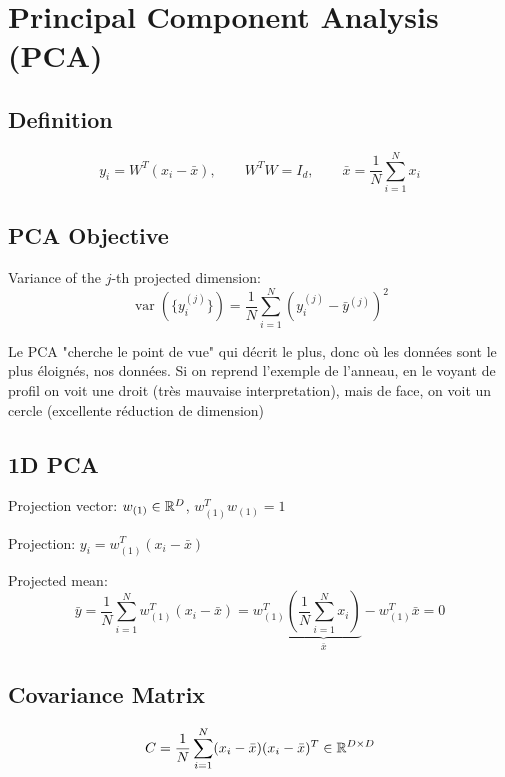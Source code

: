 \documentclass[11pt,a4paper,openany]{book}
\begin{document}
\section{Principal Component Analysis (PCA)}

\subsection{Definition}

\begin{defnbox}[title=PCA Projection]
\[
y_i = W^T(x_i - \bar{x}),
\qquad W^T W = I_d,
\qquad \bar{x} = \frac{1}{N}\sum_{i=1}^{N} x_i
\]
\end{defnbox}

\subsection{PCA Objective}

Variance of the \(j\)-th projected dimension:
\[
\operatorname{var}(\{y_i^{(j)}\})
=
\frac{1}{N}\sum_{i=1}^{N}\left(y_i^{(j)} - \bar{y}^{(j)}\right)^2
\]

\begin{propbox}[title=PCA Objective]
Le PCA "cherche le point de vue" qui décrit le plus, donc où les données sont le plus éloignés, nos données. Si on reprend l'exemple de l'anneau, en le voyant de profil on voit une droit (très mauvaise interpretation), mais de face, on voit un cercle (excellente réduction de dimension)
\end{propbox}

\subsection{1D PCA}

Projection vector: \(w_{(1)} \in \mathbb{R}^D\), \quad \(w_{(1)}^T w_{(1)} = 1\)

Projection: \(y_i = w_{(1)}^T(x_i - \bar{x})\)

Projected mean:
\[
\bar{y}
= \frac{1}{N}\sum_{i=1}^{N} w_{(1)}^T(x_i-\bar{x})
= w_{(1)}^T \underbrace{\left(\frac{1}{N}\sum_{i=1}^{N} x_i\right)}_{\bar{x}} - w_{(1)}^T \bar{x}
= 0
\]

\subsection{Covariance Matrix}

\begin{defnbox}[title=Sample Covariance Matrix]
\[
C = \frac{1}{N}\sum_{i=1}^{N}(x_i-\bar{x})(x_i-\bar{x})^T \in \mathbb{R}^{D \times D}
\]
\end{defnbox}
\end{document}
